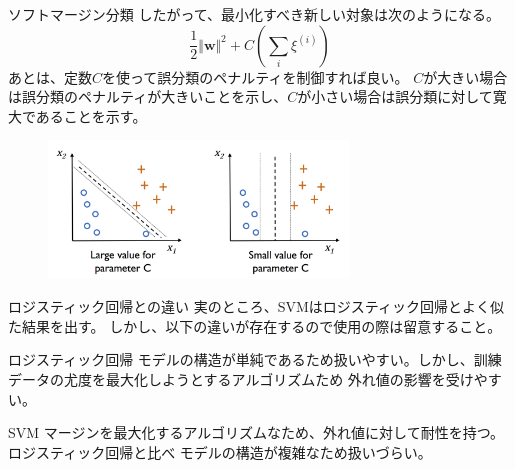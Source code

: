\documentclass[aspectratio=169, dvipdfmx, 11pt]{beamer} %
\begin{document}
\begin{frame}{ソフトマージン分類}
    したがって、最小化すべき新しい対象は次のようになる。
    \begin{equation*}
        \frac{1}{2}\Vert\textbf{w}\Vert^2 + C(\sum_{i}^{}\xi^{(i)})
    \end{equation*}
    あとは、定数\(C\)を使って誤分類のペナルティを制御すれば良い。
    \(C\)が大きい場合は誤分類のペナルティが大きいことを示し、\(C\)が小さい場合は誤分類に対して寛大であることを示す。
    \begin{figure}[b]
        \begin{center}
        \includegraphics[width=80mm]{img/day02/fig06.png}
        \end{center}
    \end{figure}
\end{frame}

\begin{frame}{ロジスティック回帰との違い}
    実のところ、SVMはロジスティック回帰とよく似た結果を出す。
    しかし、以下の違いが存在するので使用の際は留意すること。
    \begin{alertblock}{ロジスティック回帰}
        モデルの構造が単純であるため扱いやすい。しかし、訓練データの尤度を最大化しようとするアルゴリズムため
        外れ値の影響を受けやすい。
    \end{alertblock}
    \begin{exampleblock}{SVM}
        マージンを最大化するアルゴリズムなため、外れ値に対して耐性を持つ。ロジスティック回帰と比べ
        モデルの構造が複雑なため扱いづらい。
    \end{exampleblock}
\end{frame}
\end{document}
